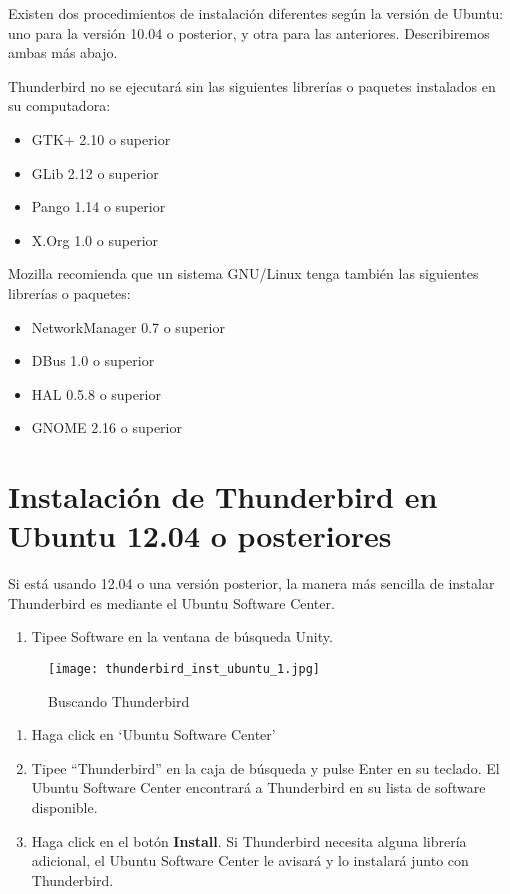 \documentclass[10pt,a5paper,twoside,,]{book}
\providecommand{\tightlist}{%
  \setlength{\itemsep}{0pt}\setlength{\parskip}{0pt}}
\begin{document}
Existen dos procedimientos de instalación diferentes según la versión de
Ubuntu: uno para la versión 10.04 o posterior, y otra para las
anteriores. Describiremos ambas más abajo.

Thunderbird no se ejecutará sin las siguientes librerías o paquetes
instalados en su computadora:

\begin{itemize}
\tightlist
\item
  GTK+ 2.10 o superior
\item
  GLib 2.12 o superior
\item
  Pango 1.14 o superior
\item
  X.Org 1.0 o superior
\end{itemize}

Mozilla recomienda que un sistema GNU/Linux tenga también las siguientes
librerías o paquetes:

\begin{itemize}
\tightlist
\item
  NetworkManager 0.7 o superior
\item
  DBus 1.0 o superior
\item
  HAL 0.5.8 o superior
\item
  GNOME 2.16 o superior
\end{itemize}

\section{Instalación de Thunderbird en Ubuntu 12.04 o
posteriores}\label{instalaciuxf3n-de-thunderbird-en-ubuntu-12.04-o-posteriores}

Si está usando 12.04 o una versión posterior, la manera más sencilla de
instalar Thunderbird es mediante el Ubuntu Software Center.

\begin{enumerate}
\def\labelenumi{\arabic{enumi}.}
\tightlist
\item
  Tipee Software en la ventana de búsqueda Unity.
\end{enumerate}

\begin{figure}[htbp]
\centering
\texttt{[image: thunderbird\_inst\_ubuntu\_1.jpg]}
\caption{Buscando Thunderbird}
\end{figure}

\begin{enumerate}
\def\labelenumi{\arabic{enumi}.}
\setcounter{enumi}{1}
\tightlist
\item
  Haga click en `Ubuntu Software Center'
\item
  Tipee ``Thunderbird'' en la caja de búsqueda y pulse Enter en su
  teclado. El Ubuntu Software Center encontrará a Thunderbird en su
  lista de software disponible.
\item
  Haga click en el botón \textbf{Install}. Si Thunderbird necesita
  alguna librería adicional, el Ubuntu Software Center le avisará y lo
  instalará junto con Thunderbird.
\end{enumerate}
\end{document}
